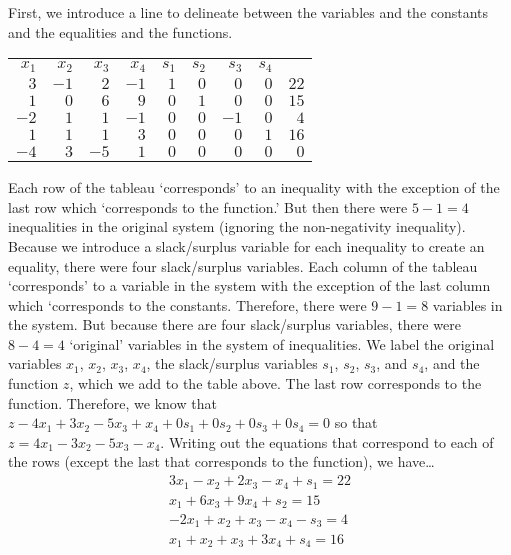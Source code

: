 \documentclass[12pt,letterpaper]{exam}
\begin{document}
\begin{questions}
{\small
\sol First, we introduce a line to delineate between the variables and the constants and the equalities and the functions. \par
	\begin{table}[!ht]
	\centering
	\begin{tabular}{rrrrrrrr|r}
	{\scriptsize $x_1$} & {\scriptsize $x_2$} & {\scriptsize $x_3$} & {\scriptsize $x_4$} & {\scriptsize $s_1$} & {\scriptsize $s_2$} & {\scriptsize $s_3$} & {\scriptsize $s_4$} & \\
	$3$ & $-1$ & $2$ & $-1$ & $1$ & $0$ & $0$ & $0$ & $22$ \\
	$1$ & $0$ & $6$ & $9$ & $0$ & $1$ & $0$ & $0$ & $15$ \\
	$-2$ & $1$ & $1$ & $-1$ & $0$ & $0$ & $-1$ & $0$ & $4$ \\
	$1$ & $1$ & $1$& $3$ & $0$ & $0$& $0$ & $1$ & $16$ \\ \hline
	$-4$ & $3$ & $-5$ & $1$ & $0$ & $0$ & $0$ & $0$ & $0$
	\end{tabular}
	\end{table} \par
Each row of the tableau `corresponds' to an inequality with the exception of the last row which `corresponds to the function.' But then there were $5 - 1= 4$ inequalities in the original system (ignoring the non-negativity inequality). Because we introduce a slack/surplus variable for each inequality to create an equality, there were four slack/surplus variables. Each column of the tableau `corresponds' to a variable in the system with the exception of the last column which `corresponds to the constants. Therefore, there were $9 - 1= 8$ variables in the system. But because there are four slack/surplus variables, there were $8 - 4= 4$ `original' variables in the system of inequalities. We label the original variables $x_1$, $x_2$, $x_3$, $x_4$, the slack/surplus variables $s_1$, $s_2$, $s_3$, and $s_4$, and the function $z$, which we add to the table above. The last row corresponds to the function. Therefore, we know that $z - 4x_1 + 3x_2 - 5x_3 + x_4 + 0s_1 + 0s_2 + 0s_3 + 0s_4= 0$ so that $z= 4x_1 - 3x_2 - 5x_3 - x_4$. Writing out the equations that correspond to each of the rows (except the last that corresponds to the function), we have\dots
	\[
	\begin{gathered}
	3x_1 - x_2 + 2x_3 - x_4 + s_1= 22 \\
	x_1 + 6x_3 + 9x_4 + s_2= 15 \\
	-2x_1 + x_2 + x_3 - x_4 - s_3= 4 \\
	x_1 + x_2 + x_3 + 3x_4 + s_4= 16

\end{gathered}\]}
\end{questions}
\end{document}
